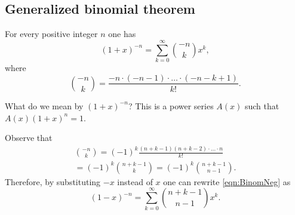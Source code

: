\begin{page}
\setcounter{section}{2}
\setcounter{subsection}{4}
\setcounter{dfn}{12}
\label{portion:860}

\subsection{Generalized binomial theorem}


\end{page}

\begin{page}
\setcounter{section}{2}
\setcounter{subsection}{4}
\setcounter{dfn}{13}
\label{portion:862}

\begin{thm}
\label{thm:BinomNeg}
For every positive integer $n$ one has
\begin{equation}
\label{eqn:BinomNeg}
(1+x)^{-n} = \sum_{k=0}^\infty \binom{-n}{k} x^k,
\end{equation}
where
\[
\binom{-n}{k} = \frac{-n \cdot (-n-1) \cdot \ldots \cdot (-n-k+1)}{k!}.
\]
\end{thm}

\end{page}

\begin{page}
\setcounter{section}{2}
\setcounter{subsection}{4}
\setcounter{dfn}{13}
\label{portion:863}


What do we mean by $(1+x)^{-n}$?
This is a power series $A(x)$ such that $A(x) (1+x)^n = 1$.


\end{page}

\begin{page}
\setcounter{section}{2}
\setcounter{subsection}{4}
\setcounter{dfn}{14}
\label{portion:865}

\begin{rem}
Observe that
\begin{multline*}
\binom{-n}{k} = (-1)^k \frac{(n+k-1) (n+k-2) \cdot \ldots \cdot n}{k!}\\
= (-1)^k \binom{n+k-1}{k} = (-1)^k \binom{n+k-1}{n-1}.
\end{multline*}
Therefore, by substituting $-x$ instead of $x$ one can rewrite \eqref{eqn:BinomNeg} as
\[
(1-x)^{-n} = \sum_{k=0}^\infty \binom{n+k-1}{n-1} x^k.
\]
\end{rem}

\end{page}

